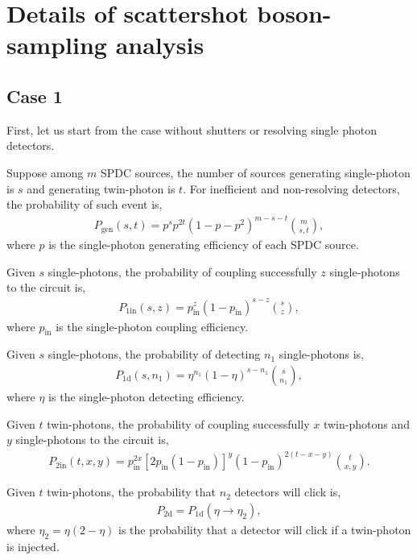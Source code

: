 \documentclass[aps,rmp,twocolumn,amsmath,amssymb,nofootinbib,superscriptaddress]{revtex4}
\begin{document}
\section{Details of scattershot boson-sampling analysis} \label{app:B}

\subsection{Case 1}

First, let us start from the case without shutters or resolving single photon detectors.

Suppose among $m$ SPDC sources, the number of sources generating single-photon is $s$ and generating twin-photon is $t$. For inefficient and non-resolving detectors, the probability of such event is,
\begin{align} \label{eq:1}
{P_\mathrm{gen}}(s,t) = {p^s}{p^{2t}}{(1 - p - {p^2})^{m - s - t}}\binom{m}{s,t},
\end{align}
where $p$ is the single-photon generating efficiency of each SPDC source.

Given $s$ single-photons, the probability of coupling successfully $z$ single-photons to the circuit is,
\begin{align} \label{eq:2}
{P_\mathrm{1in}}(s,z) = p_\mathrm{in}^{z}{(1 - {p_\mathrm{in}})^{s - z}} \binom{s}{z},
\end{align}
where ${p_\mathrm{in}}$ is the single-photon coupling efficiency.

Given $s$ single-photons, the probability of detecting ${n_1}$ single-photons is,
\begin{align} \label{eq:3}
{P_\mathrm{1d}}(s,{n_1}) = {\eta ^{{n_1}}}{(1 - \eta )^{s - {n_1}}}\binom{s}{n_1},
\end{align}
where $\eta$ is the single-photon detecting efficiency.

Given $t$ twin-photons, the probability of coupling successfully $x$ twin-photons and $y$ single-photons to the circuit is,
\begin{align} \label{eq:4}
{P_\mathrm{2in}}(t,x,y) = p_\mathrm{in}^{2x}{[2{p_\mathrm{in}}(1 - {p_\mathrm{in}})]^y} {(1 - {p_\mathrm{in}})^{2(t - x - y)}} \binom{t}{x,y}.
\end{align}

Given $t$ twin-photons, the probability that ${n_2}$ detectors will click is,
\begin{align} \label{eq:5}
{P_\mathrm{2d}} = {P_\mathrm{1d}}(\eta \to {\eta _2}),
\end{align}
where \mbox{${\eta _2} = \eta (2 - \eta )$} is the probability that a detector will click if a twin-photon is injected.
\end{document}

